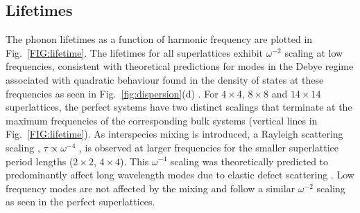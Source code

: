 

\subsection{Lifetimes}

The phonon lifetimes as a function of harmonic frequency are plotted in Fig.~\ref{FIG:lifetime}. The lifetimes for all superlattices exhibit $\omega^{-2}$ scaling at low frequencies, consistent with theoretical predictions for modes in the Debye regime associated with quadratic behaviour found in the density of states at these frequencies as seen in Fig.~\ref{fig:dispersion}(d) \cite{Klemens_Thermal_1951}. For $4\times4$, $8\times8$ and $14\times14$ superlattices, the perfect systems have two distinct scalings that terminate at the maximum frequencies of the corresponding bulk systems (vertical lines in Fig.~\ref{FIG:lifetime}). As interspecies mixing is introduced, a Rayleigh scattering scaling , $\tau \propto \omega^{-4}$ , is observed at larger frequencies for the smaller superlattice period lengths ($2\times2$, $4\times4$). This $\omega^{-4}$ scaling was theoretically predicted to predominantly affect long wavelength modes due to elastic defect scattering \cite{PhysRev.140.A1812,klemens_scattering_1955-3, klemens_thermal_1957-2}.
Low frequency modes are not affected by the mixing and follow a similar $\omega^{-2}$ scaling as seen in the perfect superlattices.

